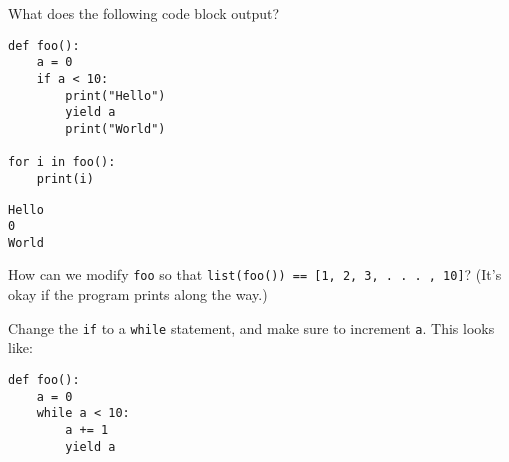 \begin{blocksection}
\question What does the following code block output?

\begin{lstlisting}
def foo():
    a = 0
    if a < 10:
        print("Hello")
        yield a
        print("World")

for i in foo():
    print(i)
\end{lstlisting}

\begin{solution}[0.75in]
\begin{lstlisting}
Hello
0
World
\end{lstlisting}
\end{solution}
\end{blocksection}

\begin{blocksection}
\question How can we modify \lstinline$foo$ so that \lstinline$list(foo()) == [1, 2, 3, . . . , 10]$? (It's okay if the program prints along the way.)

\begin{solution}[0.50in]
Change the \lstinline$if$ to a \lstinline$while$ statement, and make sure to increment
\lstinline$a$. This looks like:

\begin{lstlisting}
def foo():
    a = 0
    while a < 10:
        a += 1
        yield a
\end{lstlisting}
\end{solution}
\end{blocksection}
